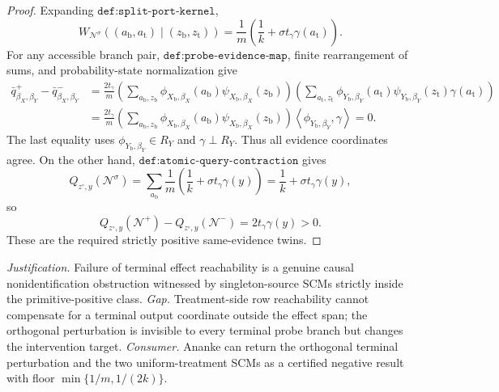 \documentclass{article}
\begin{document}
\begin{proof}
Expanding \(\texttt{def:split-port-kernel}\),
\[
W_{\mathcal N^\sigma}((a_{\mathrm b},a_{\mathrm t})\mid(z_{\mathrm b},z_{\mathrm t}))
=\frac1m\left(\frac1k+\sigma t_\gamma\gamma(a_{\mathrm t})\right).
\]
For any accessible branch pair, \(\texttt{def:probe-evidence-map}\), finite rearrangement of sums, and probability-state normalization give
\[
\begin{aligned}
\bar q^+_{\beta_X,\beta_Y}-\bar q^-_{\beta_X,\beta_Y}
&=\frac{2t_\gamma}{m}
\left(\sum_{a_{\mathrm b},z_{\mathrm b}}
\phi_{X_{\mathrm b},\beta_X}(a_{\mathrm b})
\psi_{X_{\mathrm b},\beta_X}(z_{\mathrm b})\right)
\left(\sum_{a_{\mathrm t},z_{\mathrm t}}
\phi_{Y_{\mathrm b},\beta_Y}(a_{\mathrm t})
\psi_{Y_{\mathrm b},\beta_Y}(z_{\mathrm t})
\gamma(a_{\mathrm t})\right)\\
&=\frac{2t_\gamma}{m}
\left(\sum_{a_{\mathrm b},z_{\mathrm b}}
\phi_{X_{\mathrm b},\beta_X}(a_{\mathrm b})
\psi_{X_{\mathrm b},\beta_X}(z_{\mathrm b})\right)
\left\langle\phi_{Y_{\mathrm b},\beta_Y},\gamma\right\rangle
=0.
\end{aligned}
\]
The last equality uses \(\phi_{Y_{\mathrm b},\beta_Y}\in R_Y\) and \(\gamma\perp R_Y\).  Thus all evidence coordinates agree.  On the other hand, \(\texttt{def:atomic-query-contraction}\) gives
\[
Q_{z^{\circ},y}(\mathcal N^\sigma)
=\sum_{a_{\mathrm b}}\frac1m
\left(\frac1k+\sigma t_\gamma\gamma(y)\right)
=\frac1k+\sigma t_\gamma\gamma(y),
\]
so
\[
Q_{z^{\circ},y}(\mathcal N^+)-Q_{z^{\circ},y}(\mathcal N^-)
=2t_\gamma\gamma(y)>0.
\]
These are the required strictly positive same-evidence twins.
\end{proof}
\par\smallskip\noindent \textit{Justification.} Failure of terminal effect reachability is a genuine causal nonidentification obstruction witnessed by singleton-source SCMs strictly inside the primitive-positive class. \textit{Gap.} Treatment-side row reachability cannot compensate for a terminal output coordinate outside the effect span; the orthogonal perturbation is invisible to every terminal probe branch but changes the intervention target. \textit{Consumer.} Ananke can return the orthogonal terminal perturbation and the two uniform-treatment SCMs as a certified negative result with floor \(\min\{1/m,1/(2k)\}\).
\end{document}
